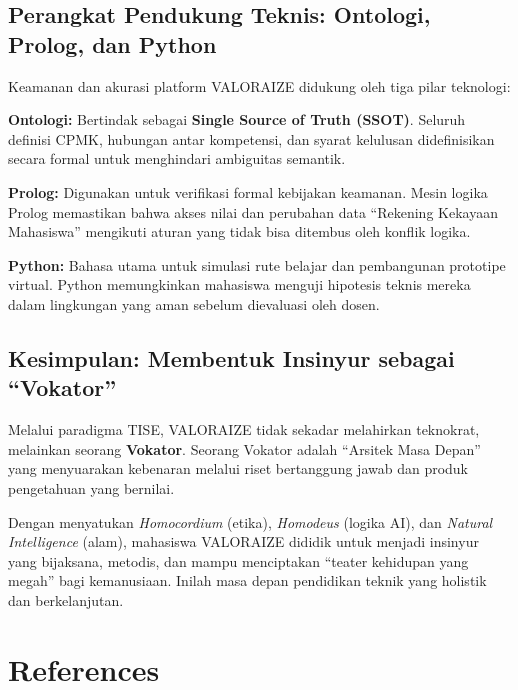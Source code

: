 \documentclass[
  letterpaper,
  DIV=11,
  numbers=noendperiod]{scrreprt}
\begin{document}
\section{Perangkat Pendukung Teknis: Ontologi, Prolog, dan
Python}\label{perangkat-pendukung-teknis-ontologi-prolog-dan-python}

Keamanan dan akurasi platform VALORAIZE didukung oleh tiga pilar
teknologi:

\textbf{Ontologi:} Bertindak sebagai \textbf{Single Source of Truth
(SSOT)}. Seluruh definisi CPMK, hubungan antar kompetensi, dan syarat
kelulusan didefinisikan secara formal untuk menghindari ambiguitas
semantik.

\textbf{Prolog:} Digunakan untuk verifikasi formal kebijakan keamanan.
Mesin logika Prolog memastikan bahwa akses nilai dan perubahan data
``Rekening Kekayaan Mahasiswa'' mengikuti aturan yang tidak bisa
ditembus oleh konflik logika.

\textbf{Python:} Bahasa utama untuk simulasi rute belajar dan
pembangunan prototipe virtual. Python memungkinkan mahasiswa menguji
hipotesis teknis mereka dalam lingkungan yang aman sebelum dievaluasi
oleh dosen.

\section{Kesimpulan: Membentuk Insinyur sebagai
``Vokator''}\label{kesimpulan-membentuk-insinyur-sebagai-vokator}

Melalui paradigma TISE, VALORAIZE tidak sekadar melahirkan teknokrat,
melainkan seorang \textbf{Vokator}. Seorang Vokator adalah ``Arsitek
Masa Depan'' yang menyuarakan kebenaran melalui riset bertanggung jawab
dan produk pengetahuan yang bernilai.

Dengan menyatukan \emph{Homocordium} (etika), \emph{Homodeus} (logika
AI), dan \emph{Natural Intelligence} (alam), mahasiswa VALORAIZE dididik
untuk menjadi insinyur yang bijaksana, metodis, dan mampu menciptakan
``teater kehidupan yang megah'' bagi kemanusiaan. Inilah masa depan
pendidikan teknik yang holistik dan berkelanjutan.


\chapter*{References}\label{references}

\end{document}
